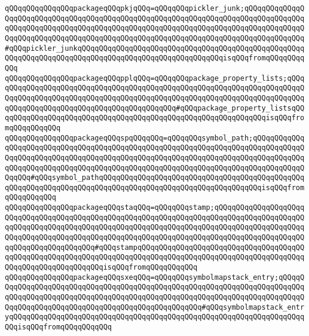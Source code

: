 \verb|qQQqqQQqqQQqqQQqpackageqQQqpkjqQQq=qQQqqQQqpickler_junk;qQQqqQQqqQQqqQQqqQQqqQQqqQQqqQQqqQQqqQQqqQQqqQQqqQQqqQQqqQQqqQQqqQQqqQQqqQQqqQQqqQQqqQQqqQQqqQQqqQQqqQQqqQQqqQQqqQQqqQQqqQQqqQQqqQQqqQQqqQQqqQQqqQQqqQQqqQQqqQQqqQQqqQQqqQQqqQQqqQQqqQQqqQQqqQQqqQQqqQQqqQQqqQQqqQQqqQQqqQQqqQQq#qQQqpickler_junkqQQqqQQqqQQqqQQqqQQqqQQqqQQqqQQqqQQqqQQqqQQqqQQqqQQqqQQqqQQqqQQqqQQqqQQqqQQqqQQqqQQqqQQqqQQqqQQqqQQqqQQqisqQQqfromqQQqqQQqqQQq|\newline
\verb|qQQqqQQqqQQqqQQqpackageqQQqpplqQQq=qQQqqQQqpackage_property_lists;qQQqqQQqqQQqqQQqqQQqqQQqqQQqqQQqqQQqqQQqqQQqqQQqqQQqqQQqqQQqqQQqqQQqqQQqqQQqqQQqqQQqqQQqqQQqqQQqqQQqqQQqqQQqqQQqqQQqqQQqqQQqqQQqqQQqqQQqqQQqqQQqqQQqqQQqqQQqqQQqqQQqqQQqqQQqqQQqqQQqqQQq#qQQqpackage_property_listsqQQqqQQqqQQqqQQqqQQqqQQqqQQqqQQqqQQqqQQqqQQqqQQqqQQqqQQqqQQqqQQqisqQQqfromqQQqqQQqqQQq|\newline
\verb|qQQqqQQqqQQqqQQqpackageqQQqspqQQqqQQq=qQQqqQQqsymbol_path;qQQqqQQqqQQqqQQqqQQqqQQqqQQqqQQqqQQqqQQqqQQqqQQqqQQqqQQqqQQqqQQqqQQqqQQqqQQqqQQqqQQqqQQqqQQqqQQqqQQqqQQqqQQqqQQqqQQqqQQqqQQqqQQqqQQqqQQqqQQqqQQqqQQqqQQqqQQqqQQqqQQqqQQqqQQqqQQqqQQqqQQqqQQqqQQqqQQqqQQqqQQqqQQqqQQqqQQqqQQqqQQqqQQq#qQQqsymbol_pathqQQqqQQqqQQqqQQqqQQqqQQqqQQqqQQqqQQqqQQqqQQqqQQqqQQqqQQqqQQqqQQqqQQqqQQqqQQqqQQqqQQqqQQqqQQqqQQqqQQqqQQqqQQqisqQQqfromqQQqqQQqqQQq|\newline
\verb|qQQqqQQqqQQqqQQqpackageqQQqstaqQQq=qQQqqQQqstamp;qQQqqQQqqQQqqQQqqQQqqQQqqQQqqQQqqQQqqQQqqQQqqQQqqQQqqQQqqQQqqQQqqQQqqQQqqQQqqQQqqQQqqQQqqQQqqQQqqQQqqQQqqQQqqQQqqQQqqQQqqQQqqQQqqQQqqQQqqQQqqQQqqQQqqQQqqQQqqQQqqQQqqQQqqQQqqQQqqQQqqQQqqQQqqQQqqQQqqQQqqQQqqQQqqQQqqQQqqQQqqQQqqQQqqQQqqQQqqQQqqQQqqQQqqQQq#qQQqstampqQQqqQQqqQQqqQQqqQQqqQQqqQQqqQQqqQQqqQQqqQQqqQQqqQQqqQQqqQQqqQQqqQQqqQQqqQQqqQQqqQQqqQQqqQQqqQQqqQQqqQQqqQQqqQQqqQQqqQQqqQQqqQQqqQQqisqQQqfromqQQqqQQqqQQq|\newline
\verb|qQQqqQQqqQQqqQQqpackageqQQqsxeqQQq=qQQqqQQqsymbolmapstack_entry;qQQqqQQqqQQqqQQqqQQqqQQqqQQqqQQqqQQqqQQqqQQqqQQqqQQqqQQqqQQqqQQqqQQqqQQqqQQqqQQqqQQqqQQqqQQqqQQqqQQqqQQqqQQqqQQqqQQqqQQqqQQqqQQqqQQqqQQqqQQqqQQqqQQqqQQqqQQqqQQqqQQqqQQqqQQqqQQqqQQqqQQqqQQqqQQq#qQQqsymbolmapstack_entryqQQqqQQqqQQqqQQqqQQqqQQqqQQqqQQqqQQqqQQqqQQqqQQqqQQqqQQqqQQqqQQqqQQqqQQqisqQQqfromqQQqqQQqqQQq|\newline
